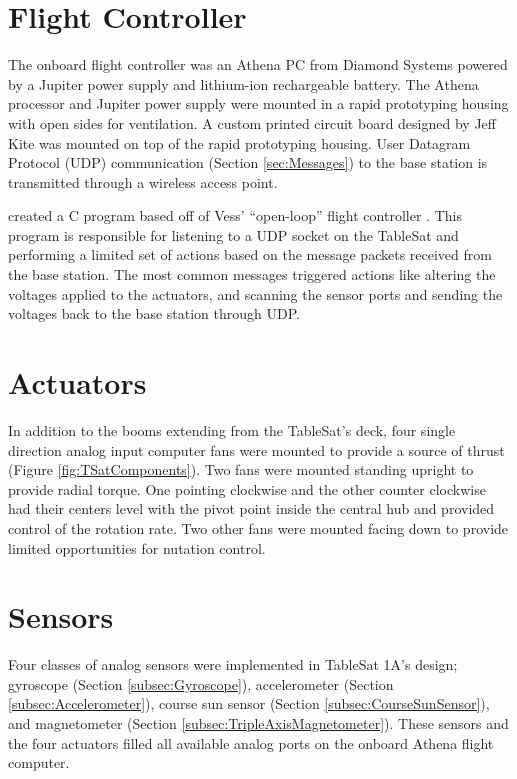 \section{Flight Controller}
\label{sec:FlightController}

The onboard flight controller was an Athena PC from Diamond Systems powered by a Jupiter power supply and lithium-ion rechargeable battery.  The Athena processor and Jupiter power supply were mounted in a rapid prototyping housing with open sides for ventilation.  A custom printed circuit board designed by Jeff Kite  was mounted on top of the rapid prototyping housing.  User Datagram Protocol (UDP) communication (Section \ref{sec:Messages}) to the base station is transmitted through a wireless access point.

 created a C program based off of Vess' ``open-loop'' flight controller \cite{vessthesis} .  This program is responsible for listening to a UDP socket on the TableSat and performing a limited set of actions based on the message packets received from the base station.  The most common messages triggered actions like altering the voltages applied to the actuators, and scanning the sensor ports and sending the voltages back to the base station through UDP.

\section{Actuators}
\label{sec:Actuators}

In addition to the booms extending from the TableSat's deck, four single direction analog input computer fans were mounted to provide a source of thrust (Figure \ref{fig:TSatComponents}).  Two fans were mounted standing upright to provide radial torque.  One pointing clockwise and the other counter clockwise had their centers level with the pivot point inside the central hub and provided control of the rotation rate.  Two other fans were mounted facing down to provide limited opportunities for nutation control.

\section{Sensors}
\label{sec:Sensors}

Four classes of analog sensors were implemented in TableSat 1A's design; gyroscope (Section \ref{subsec:Gyroscope}), accelerometer (Section \ref{subsec:Accelerometer}), course sun sensor (Section \ref{subsec:CourseSunSensor}), and magnetometer (Section \ref{subsec:TripleAxisMagnetometer}).  These sensors and the four actuators filled all available analog ports on the onboard Athena flight computer.

